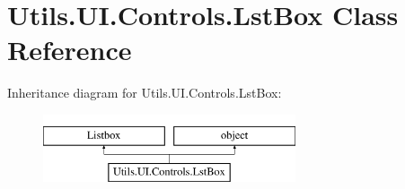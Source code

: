 \hypertarget{class_c_utils_1_1_utils_1_1_u_i_1_1_controls_1_1_lst_box}{}\section{Utils.\+U\+I.\+Controls.\+Lst\+Box Class Reference}
\label{class_c_utils_1_1_utils_1_1_u_i_1_1_controls_1_1_lst_box}
Inheritance diagram for Utils.\+U\+I.\+Controls.\+Lst\+Box\+:\begin{figure}[H]
\begin{center}
\leavevmode
\includegraphics[height=2.000000cm]{class_c_utils_1_1_utils_1_1_u_i_1_1_controls_1_1_lst_box}
\end{center}
\end{figure}

